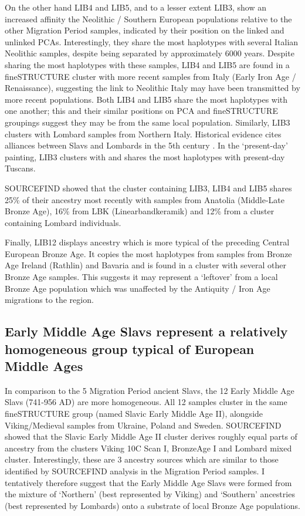 On the other hand LIB4 and LIB5, and to a lesser extent LIB3, show an increased affinity the Neolithic / Southern European populations relative to the other Migration Period samples, indicated by their position on the linked and unlinked PCAs. Interestingly, they share the most haplotypes with several Italian Neolithic samples, despite being separated by approximately 6000 years. Despite sharing the most haplotypes with these samples, LIB4 and LIB5 are found in a fineSTRUCTURE cluster with more recent samples from Italy (Early Iron Age / Renaissance), suggesting the link to Neolithic Italy may have been transmitted by more recent populations. Both LIB4 and LIB5 share the most haplotypes with one another; this and their similar positions on PCA and fineSTRUCTURE groupings suggest they may be from the same local population. Similarly, LIB3 clusters with Lombard samples from Northern Italy. Historical evidence cites alliances between Slavs and Lombards in the 5th century \cite{lotter2003volkerverschiebungen}. In the `present-day' painting, LIB3 clusters with and shares the most haplotypes with present-day Tuscans.  

SOURCEFIND showed that the cluster containing LIB3, LIB4 and LIB5 shares 25\% of their ancestry most recently with samples from Anatolia (Middle-Late Bronze Age), 16\% from LBK (Linearbandkeramik) and 12\% from a cluster containing Lombard individuals. 

Finally, LIB12 displays ancestry which is more typical of the preceding Central European Bronze Age. It copies the most haplotypes from samples from Bronze Age Ireland (Rathlin) and Bavaria and is found in a cluster with several other Bronze Age samples. This suggests it may represent a `leftover' from a local Bronze Age population which was unaffected by the Antiquity / Iron Age migrations to the region.

\subsection{Early Middle Age Slavs represent a relatively homogeneous group typical of European Middle Ages}

In comparison to the 5 Migration Period ancient Slavs, the 12 Early Middle Age Slavs (741-956 AD) are more homogeneous. All 12 samples cluster in the same fineSTRUCTURE group (named Slavic Early Middle Age II), alongside Viking/Medieval samples from Ukraine, Poland and Sweden. SOURCEFIND showed that the Slavic Early Middle Age II cluster derives roughly equal parts of ancestry from the clusters Viking 10C Scan I, BronzeAge I and Lombard mixed cluster. Interestingly, these are 3 ancestry sources which are similar to those identified by SOURCEFIND analysis in the Migration Period samples. I tentatively therefore suggest that the Early Middle Age Slavs were formed from the mixture of `Northern' (best represented by Viking) and `Southern' ancestries (best represented by Lombards) onto a substrate of local Bronze Age populations.

